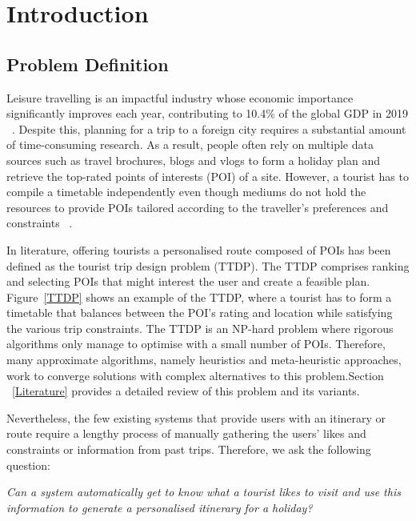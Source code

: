 \section{Introduction}
\label{Introduction}

\subsection{Problem Definition}
Leisure travelling is an impactful industry
whose economic importance significantly improves each
year, contributing to 10.4\% of the global GDP in 2019
~\cite{wttc2018travel}. Despite this, planning for a trip to a
foreign city requires a substantial amount of
time-consuming research. As a result, people often
rely on multiple data sources such as travel
brochures, blogs and vlogs to form a holiday plan and
retrieve the top-rated points of interests (POI) of a site. 
However, a tourist has to compile a timetable
independently even though mediums do not hold the
resources to provide POIs tailored according to the
traveller's preferences and constraints
~\cite{DeChoudhury2010}. 

In literature, offering tourists a personalised route
composed of POIs has been defined as the tourist trip
design problem (TTDP). The TTDP comprises ranking
and selecting POIs that might interest the user and
create a feasible plan. Figure~\ref{TTDP} shows an example
of the TTDP,  where a tourist has to form a timetable
that balances between the POI's rating and location
while satisfying the various trip constraints. 
The TTDP is an NP-hard problem where rigorous
algorithms only manage to optimise with a small number
of POIs. Therefore, many approximate algorithms,
namely heuristics and meta-heuristic approaches, work
to converge solutions with complex alternatives to
this problem.Section
~\ref{Literature} provides a detailed review of this problem and its
variants.  


Nevertheless, the few existing systems that provide
users with an itinerary or route require a lengthy
process of manually gathering the users' likes and
constraints or information from past trips. Therefore, we ask the following question: 


\begin{center}

    \textit{Can a system automatically get to know
    what a tourist likes to visit and use this
information to generate a personalised itinerary for a
holiday?}

\end{center}


